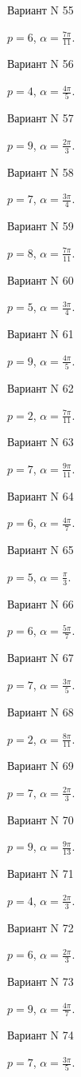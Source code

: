 \documentclass[11pt]{report}
\begin{document}
Вариант N 55

$p = 6$, $\alpha = \frac{7 \pi}{11}$.

Вариант N 56

$p = 4$, $\alpha = \frac{4 \pi}{5}$.

Вариант N 57

$p = 9$, $\alpha = \frac{2 \pi}{3}$.

Вариант N 58

$p = 7$, $\alpha = \frac{3 \pi}{4}$.

Вариант N 59

$p = 8$, $\alpha = \frac{7 \pi}{11}$.

Вариант N 60

$p = 5$, $\alpha = \frac{3 \pi}{4}$.

Вариант N 61

$p = 9$, $\alpha = \frac{4 \pi}{5}$.

Вариант N 62

$p = 2$, $\alpha = \frac{7 \pi}{11}$.

Вариант N 63

$p = 7$, $\alpha = \frac{9 \pi}{11}$.

Вариант N 64

$p = 6$, $\alpha = \frac{4 \pi}{7}$.

Вариант N 65

$p = 5$, $\alpha = \frac{\pi}{3}$.

Вариант N 66

$p = 6$, $\alpha = \frac{5 \pi}{7}$.

Вариант N 67

$p = 7$, $\alpha = \frac{3 \pi}{5}$.

Вариант N 68

$p = 2$, $\alpha = \frac{8 \pi}{11}$.

Вариант N 69

$p = 7$, $\alpha = \frac{2 \pi}{3}$.

Вариант N 70

$p = 9$, $\alpha = \frac{9 \pi}{13}$.

Вариант N 71

$p = 4$, $\alpha = \frac{2 \pi}{3}$.

Вариант N 72

$p = 6$, $\alpha = \frac{2 \pi}{3}$.

Вариант N 73

$p = 9$, $\alpha = \frac{4 \pi}{7}$.

Вариант N 74

$p = 7$, $\alpha = \frac{3 \pi}{5}$.
\end{document}
